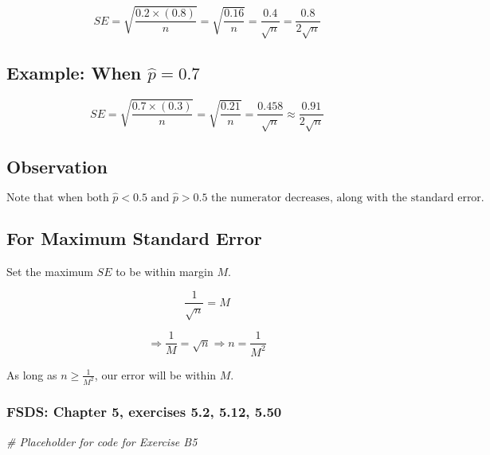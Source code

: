 \documentclass[
]{article}
\newenvironment{Shaded}{\begin{snugshade}}{\end{snugshade}}
\newcommand{\CommentTok}[1]{\textcolor[rgb]{0.56,0.35,0.01}{\textit{#1}}}
\begin{document}
\[
SE = \sqrt{\frac{0.2 \times (0.8)}{n}} = \sqrt{\frac{0.16}{n}} = \frac{0.4}{\sqrt{n}} = \frac{0.8}{2\sqrt{n}}
\]

\hypertarget{example-when-hatp-0.7}{%
\subsection{\texorpdfstring{Example: When
\(\hat{p} = 0.7\)}{Example: When \textbackslash hat\{p\} = 0.7}}\label{example-when-hatp-0.7}}

\[
SE = \sqrt{\frac{0.7 \times (0.3)}{n}} = \sqrt{\frac{0.21}{n}} = \frac{0.458}{\sqrt{n}} \approx \frac{0.91}{2\sqrt{n}}
\]

\hypertarget{observation}{%
\subsection{Observation}\label{observation}}

\[
\text{Note that when both } \hat{p} < 0.5 \text{ and } \hat{p} > 0.5 \text{ the numerator decreases, along with the standard error.}
\]

\hypertarget{for-maximum-standard-error}{%
\subsection{For Maximum Standard
Error}\label{for-maximum-standard-error}}

Set the maximum \(SE\) to be within margin \(M\).

\[
\frac{1}{\sqrt{n}} = M
\]

\[
\Rightarrow \frac{1}{M} = \sqrt{n} \Rightarrow n = \frac{1}{M^2}
\]

As long as \(n \geq \frac{1}{M^2}\), our error will be within \(M\).

\hypertarget{fsds-chapter-5-exercises-5.2-5.12-5.50}{%
\subsubsection{FSDS: Chapter 5, exercises 5.2, 5.12,
5.50}\label{fsds-chapter-5-exercises-5.2-5.12-5.50}}

\begin{Shaded}
\begin{Highlighting}[]
\CommentTok{\# Placeholder for code for Exercise B5}
\end{Highlighting}
\end{Shaded}
\end{document}
